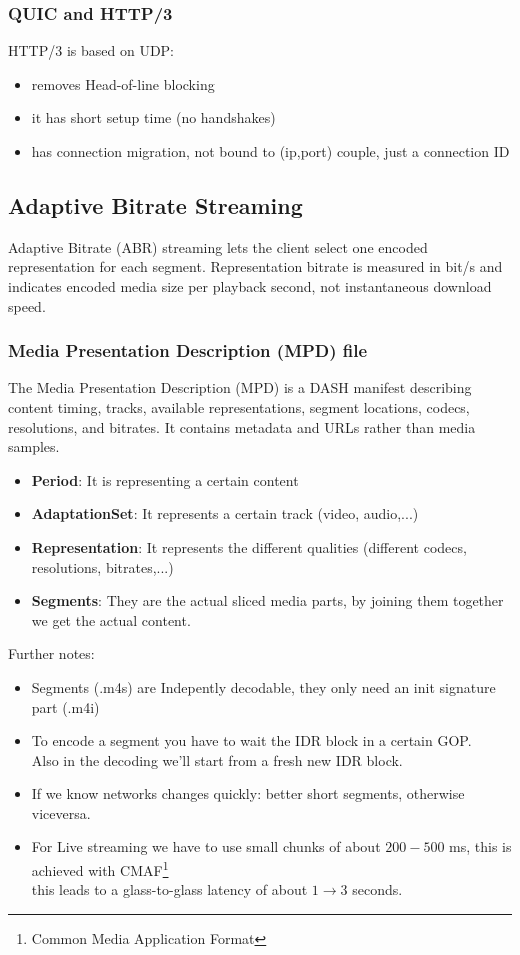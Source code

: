 \subsubsection{QUIC and HTTP/3}
HTTP/3 is based on UDP:
\begin{itemize}
    \item removes Head-of-line blocking
    \item it has short setup time (no handshakes)
    \item has connection migration, not bound to (ip,port) couple, just a connection ID
\end{itemize}
\subsection{Adaptive Bitrate Streaming}
Adaptive Bitrate (ABR) streaming lets the client select one encoded representation for each segment. Representation bitrate is measured in bit/s and indicates encoded media size per playback second, not instantaneous download speed.
\subsubsection{Media Presentation Description (MPD) file}
The Media Presentation Description (MPD) is a DASH manifest describing content timing, tracks, available representations, segment locations, codecs, resolutions, and bitrates. It contains metadata and URLs rather than media samples.
\begin{itemize}
    \item \textbf{Period}: It is representing a certain content
    \item \textbf{AdaptationSet}: It represents a certain track (video, audio,...)
    \item \textbf{Representation}: It represents the different qualities (different codecs, resolutions, bitrates,...)
    \item \textbf{Segments}: They are the actual sliced media parts, by joining them together we get the actual content.
\end{itemize}
Further notes:
\begin{itemize}
    \item Segments (.m4s) are Indepently decodable, they only need an init signature part (.m4i)
    \item To encode a segment you have to wait the IDR block in a certain GOP.\\
    Also in the decoding we'll start from a fresh new IDR block.
    \item If we know networks changes quickly: better short segments, otherwise viceversa.
    \item For Live streaming we have to use small chunks of about $200 - 500$ ms, this is achieved with CMAF\footnote{Common Media Application Format}\\
    this leads to a glass-to-glass latency of about $1 \to 3$ seconds.
\end{itemize}
